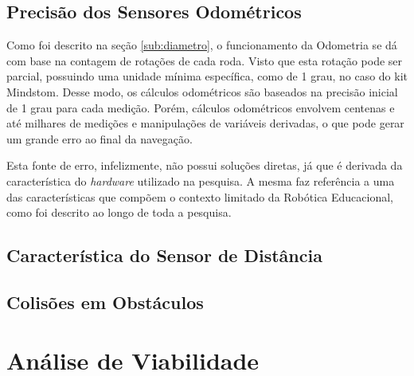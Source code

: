 \subsection{Precisão dos Sensores Odométricos}
\label{sub:precisao_sensores}

  Como foi descrito na seção \ref{sub:diametro}, o funcionamento da Odometria se dá com base na contagem de rotações de cada roda.
  Visto que esta rotação pode ser parcial, possuindo uma unidade mínima específica, como de 1 grau, no caso do kit Mindstom. Desse modo,
  os cálculos odométricos são baseados na precisão inicial de 1 grau para cada medição. Porém, cálculos odométricos envolvem centenas e até
  milhares de medições e manipulações de variáveis derivadas, o que pode gerar um grande erro ao final da navegação.

  Esta fonte de erro, infelizmente, não possui soluções diretas, já que é derivada da característica do \textit{hardware} utilizado
  na pesquisa. A mesma faz referência a uma das características que compõem o contexto limitado da Robótica Educacional,
  como foi descrito ao longo de toda a pesquisa.

\subsection{Característica do Sensor de Distância}
\label{sub:caracteristica_sensor}

\subsection{Colisões em Obstáculos}
\label{sub:colisao}

\section{Análise de Viabilidade}
\label{sec:viabilidade}
